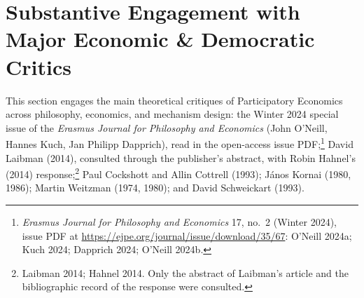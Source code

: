 \documentclass[10pt,twoside,openany]{book}
\theoremstyle{dpepstyle}
\begin{document}
\section{Substantive Engagement with Major Economic \& Democratic Critics}
\label{sec:critics}

This section engages the main theoretical critiques of Participatory Economics across philosophy, economics, and mechanism design: the Winter 2024 special issue of the \emph{Erasmus Journal for Philosophy and Economics} (John O'Neill, Hannes Kuch, Jan Philipp Dapprich), read in the open-access issue PDF;\footnote{\emph{Erasmus Journal for Philosophy and Economics} 17, no.~2 (Winter 2024), issue PDF at \url{https://ejpe.org/journal/issue/download/35/67}: O'Neill 2024a; Kuch 2024; Dapprich 2024; O'Neill 2024b.} David Laibman (2014), consulted through the publisher's abstract, with Robin Hahnel's (2014) response;\footnote{Laibman 2014; Hahnel 2014. Only the abstract of Laibman's article and the bibliographic record of the response were consulted.} Paul Cockshott and Allin Cottrell (1993); J\'anos Kornai (1980, 1986); Martin Weitzman (1974, 1980); and David Schweickart (1993).
\end{document}

